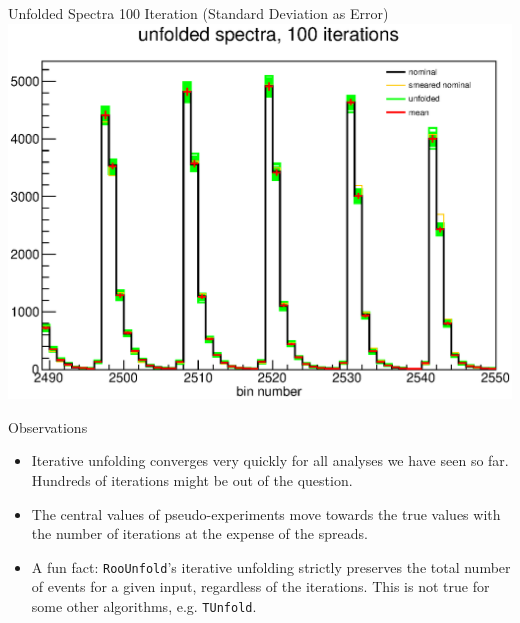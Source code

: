 \documentclass[aspectratio=169]{beamer}
\begin{document}
\begin{frame}{Unfolded Spectra 100 Iteration (Standard Deviation as Error)}
  \centering
  \includegraphics[height=\textheight]{figures/unfolded_pseudo_exps_iter100.eps}
\end{frame}

\begin{frame}{Observations}
  \begin{itemize}
    \item Iterative unfolding converges very quickly for all analyses we have seen so far. Hundreds of iterations might be out of the question.
    \item The central values of pseudo-experiments move towards the true values with the number of iterations at the expense of the spreads.
    \item A fun fact: \texttt{RooUnfold}'s iterative unfolding strictly preserves the total number of events for a given input, regardless of the iterations. This is not true for some other algorithms, e.g. \texttt{TUnfold}.
  \end{itemize}
\end{frame}
\end{document}
